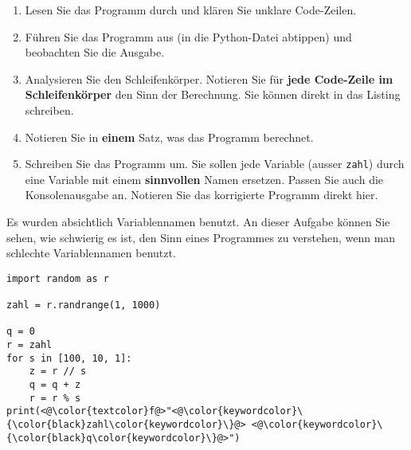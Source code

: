 \begin{enumerate}
\item Lesen Sie das Programm durch und klären Sie unklare Code-Zeilen.
\item Führen Sie das Programm aus (in die Python-Datei  abtippen) und beobachten Sie die Ausgabe.
\item Analysieren Sie den Schleifenkörper. Notieren Sie für \textbf{jede Code-Zeile im Schleifenkörper} den Sinn der Berechnung. Sie können direkt in das Listing schreiben.
\item Notieren Sie in \textbf{einem} Satz, was das Programm berechnet.
\item Schreiben Sie das Programm um. Sie sollen jede Variable (ausser \lstinline{zahl}) durch eine Variable mit einem \textbf{sinnvollen} Namen ersetzen. Passen Sie auch die Konsolenausgabe an. Notieren Sie das korrigierte Programm direkt hier.
\end{enumerate}

\begin{hinweis}
Es wurden absichtlich  Variablennamen benutzt. An dieser Aufgabe können Sie sehen, wie schwierig es ist, den Sinn eines Programmes zu verstehen, wenn man schlechte Variablennamen benutzt.
\end{hinweis}

\begin{lstlisting}[caption={\graybgtexttt{unbekannte\_berechnung.py}}, label={lst-modulo-aufgabe-3}]
import random as r

zahl = r.randrange(1, 1000)

q = 0
r = zahl
for s in [100, 10, 1]:
    z = r // s
    q = q + z
    r = r % s
print(<@\color{textcolor}f@>"<@\color{keywordcolor}\{\color{black}zahl\color{keywordcolor}\}@> <@\color{keywordcolor}\{\color{black}q\color{keywordcolor}\}@>")
\end{lstlisting}

